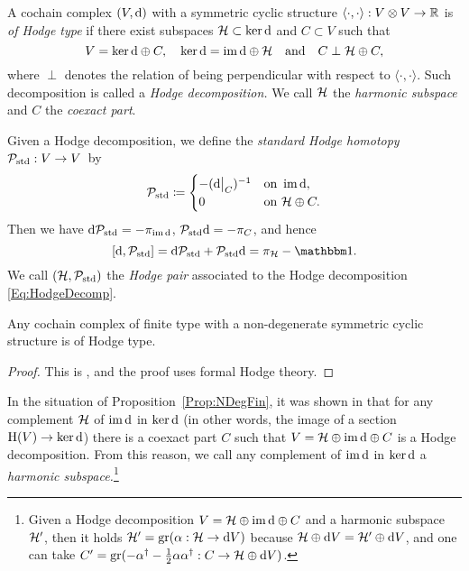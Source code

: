\documentclass[\MainFolder/Text.tex]{subfiles}
\begin{document}
\begin{Definition}\label{Def:HodgeDecomp}
A cochain complex $(V,\mathrm{d})$ with a symmetric cyclic structure $\langle\cdot,\cdot\rangle: V\otimes V \rightarrow \mathbb{R}$ is \emph{of Hodge type} if there exist subspaces $\mathcal{H} \subset \operatorname{ker} \mathrm{d}$ and $C\subset V$ such that 
\begin{equation}\label{Eq:HodgeDecomp}
V = \operatorname{ker} \mathrm{d} \oplus C, \quad \operatorname{ker} \mathrm{d} = \operatorname{im} \mathrm{d} \oplus \mathcal{H}\quad\text{and}\quad C \perp \mathcal{H} \oplus C,
\end{equation}
where $\perp$ denotes the relation of being perpendicular with respect to $\langle\cdot,\cdot\rangle$. Such decomposition is called a \emph{Hodge decomposition.} We call $\mathcal{H}$ the \emph{harmonic subspace} and $C$ the \emph{coexact part}.

Given a Hodge decomposition, we define the \emph{standard Hodge homotopy} $\mathcal{P}_{\mathrm{std}}: V \rightarrow V$~by 
\[\HtpStd \coloneqq \begin{cases}
    -(\Restr{\Dd}{C})^{-1} & \text{on }\Im \Dd, \\
    0 & \text{on } \Harm \oplus C.
   \end{cases}\]
Then we have $\mathrm{d} \mathcal{P}_{\mathrm{std}} = - \pi_{\operatorname{im} \mathrm{d}}$, $\mathcal{P}_{\mathrm{std}} \mathrm{d} = -\pi_{C}$, and hence 
\[ [\Dd,\HtpStd] = \Dd \HtpStd + \HtpStd \Dd = \pi_\Harm - \Id.\]
 We call $(\mathcal{H},\mathcal{P}_{\mathrm{std}})$ the \emph{Hodge pair} associated to the Hodge decomposition \eqref{Eq:HodgeDecomp}.
\end{Definition}

\begin{Proposition}\label{Prop:NDegFin}
Any cochain complex of finite type with a non-degenerate symmetric cyclic structure is of Hodge type.
\end{Proposition}
\begin{proof}
This is \cite[Lemma~11.1]{Cieliebak2015}, and the proof uses formal Hodge theory.
\end{proof}

\begin{Remark}\label{Rem:RemarkHarm}
In the situation of Proposition~\ref{Prop:NDegFin}, it was shown in \cite[Remark~2.6]{Van2019} that for any complement $\mathcal{H}$ of $\operatorname{im}\mathrm{d}$ in $\ker\mathrm{d}$ (in other words, the image of a section $\mathrm{H}(V)\rightarrow \operatorname{ker}\mathrm{d}$) there is a coexact part $C$ such that $V=\mathcal{H} \oplus \operatorname{im} \mathrm{d} \oplus C$ is a Hodge decomposition. From this reason, we call any complement of $\operatorname{im} \mathrm{d}$ in $\ker \mathrm{d}$ a \emph{harmonic subspace.}\footnote{Given a Hodge decomposition $V=\mathcal{H}\oplus\operatorname{im}\mathrm{d}\oplus C$ and a harmonic subspace $\mathcal{H}'$, then it holds $\mathcal{H}' = \mathrm{gr}(\alpha: \mathcal{H} \rightarrow \mathrm{d} V)$ because $\mathcal{H} \oplus \mathrm{d} V = \mathcal{H}' \oplus \mathrm{d} V$, and one can take $C'=\mathrm{gr}(- \alpha^\dagger - \frac{1}{2}\alpha\alpha^\dagger: C \rightarrow \mathcal{H}\oplus\mathrm{d} V)$.}
\end{Remark}
\end{document}
